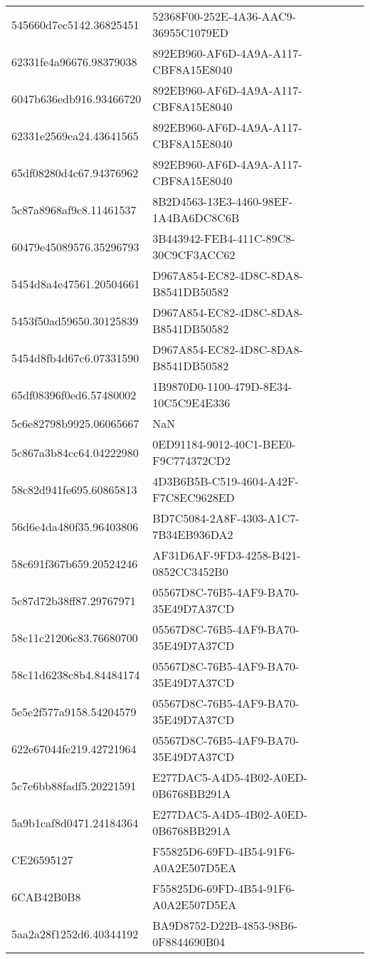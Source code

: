 \begin{tabular}{ll}
545660d7ec5142.36825451 & 52368F00-252E-4A36-AAC9-36955C1079ED \\
62331fe4a96676.98379038 & 892EB960-AF6D-4A9A-A117-CBF8A15E8040 \\
6047b636edb916.93466720 & 892EB960-AF6D-4A9A-A117-CBF8A15E8040 \\
62331e2569ea24.43641565 & 892EB960-AF6D-4A9A-A117-CBF8A15E8040 \\
65df08280d4c67.94376962 & 892EB960-AF6D-4A9A-A117-CBF8A15E8040 \\
5c87a8968af9c8.11461537 & 8B2D4563-13E3-4460-98EF-1A4BA6DC8C6B \\
60479e45089576.35296793 & 3B443942-FEB4-411C-89C8-30C9CF3ACC62 \\
5454d8a4e47561.20504661 & D967A854-EC82-4D8C-8DA8-B8541DB50582 \\
5453f50ad59650.30125839 & D967A854-EC82-4D8C-8DA8-B8541DB50582 \\
5454d8fb4d67c6.07331590 & D967A854-EC82-4D8C-8DA8-B8541DB50582 \\
65df08396f0ed6.57480002 & 1B9870D0-1100-479D-8E34-10C5C9E4E336 \\
5c6e82798b9925.06065667 & NaN \\
5c867a3b84cc64.04222980 & 0ED91184-9012-40C1-BEE0-F9C774372CD2 \\
58c82d941fe695.60865813 & 4D3B6B5B-C519-4604-A42F-F7C8EC9628ED \\
56d6e4da480f35.96403806 & BD7C5084-2A8F-4303-A1C7-7B34EB936DA2 \\
58c691f367b659.20524246 & AF31D6AF-9FD3-4258-B421-0852CC3452B0 \\
5c87d72b38ff87.29767971 & 05567D8C-76B5-4AF9-BA70-35E49D7A37CD \\
58c11c21206c83.76680700 & 05567D8C-76B5-4AF9-BA70-35E49D7A37CD \\
58c11d6238c8b4.84484174 & 05567D8C-76B5-4AF9-BA70-35E49D7A37CD \\
5e5e2f577a9158.54204579 & 05567D8C-76B5-4AF9-BA70-35E49D7A37CD \\
622e67044fe219.42721964 & 05567D8C-76B5-4AF9-BA70-35E49D7A37CD \\
5c7e6bb88fadf5.20221591 & E277DAC5-A4D5-4B02-A0ED-0B6768BB291A \\
5a9b1caf8d0471.24184364 & E277DAC5-A4D5-4B02-A0ED-0B6768BB291A \\
CE26595127 & F55825D6-69FD-4B54-91F6-A0A2E507D5EA \\
6CAB42B0B8 & F55825D6-69FD-4B54-91F6-A0A2E507D5EA \\
5aa2a28f1252d6.40344192 & BA9D8752-D22B-4853-98B6-0F8844690B04 \\

\end{tabular}

